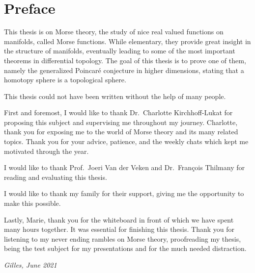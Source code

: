 \chapter*{Preface}
\label{ch:preface}

This thesis is on Morse theory,
the study of nice real valued functions on manifolds,
called Morse functions.
While elementary, they provide great insight in the structure of manifolds, eventually leading to some of the most important theorems in differential topology.
The goal of this thesis is to prove one of them, namely the generalized Poincaré conjecture in higher dimensions, stating that a homotopy sphere is a topological sphere.

This thesis could not have been written without the help of many people.

First and foremost, I would like to thank Dr.~Charlotte Kirchhoff-Lukat for proposing this subject and supervising me throughout my journey.
Charlotte, thank you for exposing me to the world of Morse theory and its many related topics.
Thank you for your advice, patience, and the weekly chats which kept me motivated through the year.

I would like to thank Prof.~Joeri Van der Veken and Dr.~François Thilmany for reading and evaluating this thesis.

I would like to thank my family for their support, giving me the opportunity to make this possible.

Lastly, Marie, thank you for the whiteboard in front of which we have spent many hours together.
It was essential for finishing this thesis.
Thank you for listening to my never ending rambles on Morse theory, proofreading my thesis, being the test subject for my presentations and for the much needed distraction.

\hfill \emph{Gilles, June 2021}
